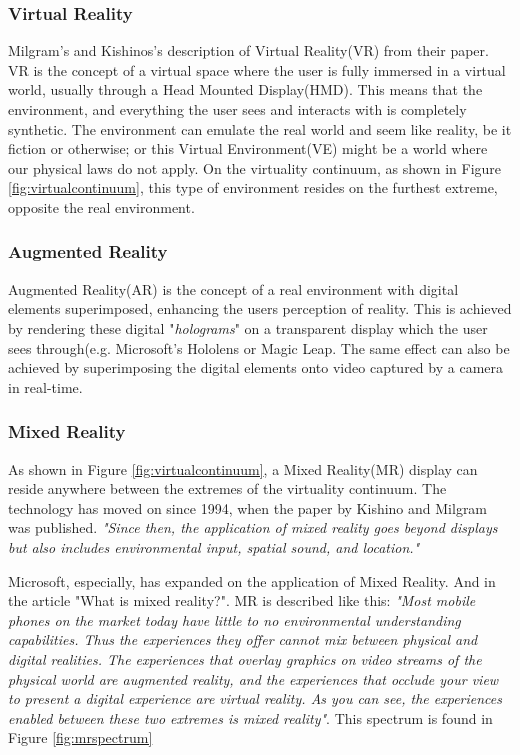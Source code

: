         \subsubsection{Virtual Reality}
            Milgram's and Kishinos's description of Virtual Reality(VR) from their paper\cite{Milgram1994}. VR is the concept of a virtual space where the user is fully immersed in a virtual world, usually through a Head Mounted Display(HMD). This means that the environment, and everything the user sees and interacts with is completely synthetic. The environment can emulate the real world and seem like reality, be it fiction or otherwise; or this Virtual Environment(VE) might be a world where our physical laws do not apply. On the virtuality continuum, as shown in Figure \ref{fig:virtualcontinuum}, this type of environment resides on the furthest extreme, opposite the real environment.
    
        \subsubsection{Augmented Reality}
            Augmented Reality(AR) is the concept of a real environment with digital elements superimposed, enhancing the users perception of reality\cite{Milgram1994}. This is achieved by rendering these digital "\emph{holograms}" on a transparent display which the user sees through(e.g. Microsoft's Hololens\cite{hololens} or Magic Leap\cite{magicleap}. The same effect can also be achieved by superimposing the digital elements onto video captured by a camera in real-time.
        
        \subsubsection{Mixed Reality}
            As shown in Figure \ref{fig:virtualcontinuum}, a Mixed Reality(MR) display can reside anywhere between the extremes of the virtuality continuum\cite{Milgram1994}. The technology has moved on since 1994, when the paper by Kishino and Milgram was published. \emph{"Since then, the application of mixed reality goes beyond displays but also includes environmental input, spatial sound, and location."}\cite{wdc-mr}
            
            Microsoft, especially, has expanded on the application of Mixed Reality. And in the article "What is mixed reality?"\cite{wdc-mr}. MR is described like this: \emph{"Most mobile phones on the market today have little to no environmental understanding capabilities. Thus the experiences they offer cannot mix between physical and digital realities. The experiences that overlay graphics on video streams of the physical world are augmented reality, and the experiences that occlude your view to present a digital experience are virtual reality. As you can see, the experiences enabled between these two extremes is mixed reality"}\cite{wdc-mr}. This spectrum is found in Figure \ref{fig:mrspectrum}
            
